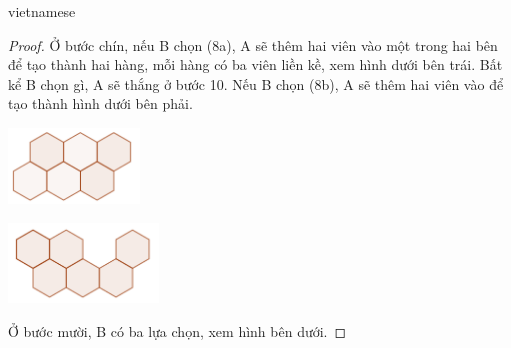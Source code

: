 \documentclass{article}
\begin{document}
\begin{otherlanguage*}{vietnamese}
\begin{proof}
    Ở bước chín, nếu B chọn (8a), A sẽ thêm hai viên vào một trong hai bên để tạo thành hai hàng, mỗi hàng có ba viên liền kề, xem hình dưới bên trái.
    Bất kể B chọn gì, A sẽ thắng ở bước 10.
    Nếu B chọn (8b),  A sẽ thêm hai viên vào để tạo thành hình dưới bên phải.

    \begin{center}
        \centering
        \begin{minipage}[t]{3.5cm}
            \begin{center}
                \includegraphics[width=3.5cm]{./svg/pdf/pi-2024-1-p3-9a.pdf}
            \end{center}
        \end{minipage}
        \qquad
        \begin{minipage}[t]{4cm}
            \begin{center}
                \includegraphics[width=4cm]{./svg/pdf/pi-2024-1-p3-9b.pdf}
            \end{center}
        \end{minipage}
    \end{center}

    Ở bước mười, B có ba lựa chọn, xem hình bên dưới.


\end{proof}
\end{otherlanguage*}
\end{document}
